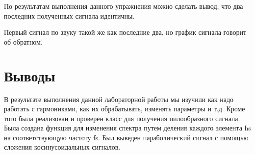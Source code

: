\documentclass[a4paper, 14pt]{extarticle}
\begin{document}
    По результатам выполнения данного упражнения можно сделать вывод, что два последних полученных сигнала идентичны.

    Первый сигнал по звуку такой же как последние два, но график сигнала говорит об обратном.

    \section{Выводы}
    \label{sec:conclusions}
    В результате выполнения данной лабораторной работы мы изучили как надо работать с гармониками, как их обрабатывать, изменять параметры и т.д.
    Кроме того была реализован и проверен класс для получения пилообразного сигнала.
    Была создана функция для изменения спектра путем деления каждого элемента hs на соответствующую частоту fs.
    Был выведен параболический сигнал с помощью сложения косинусоидальных сигналов.
\end{document}
